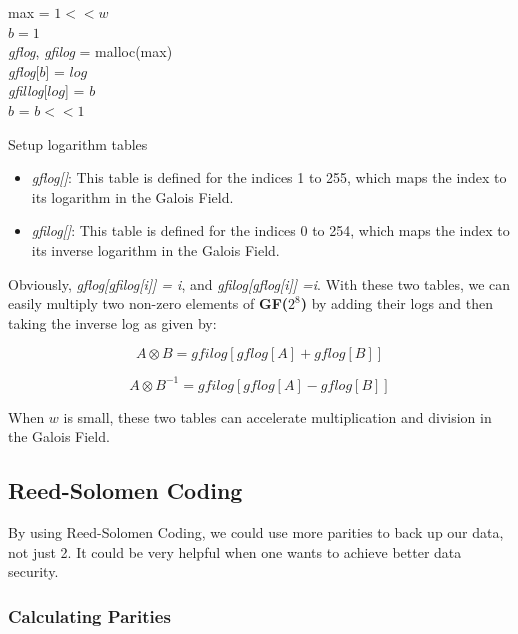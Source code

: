 \documentclass[journal]{IEEEtran}
\begin{document}
\begin{algorithm}
	max = $1<<w$ \\
	$b = 1$ \\
	\emph{gflog}, \emph{gfilog} = malloc(max)\\
	{
		\emph{gflog}[$b$] = $log$\\
		\emph{gfillog}[$log$] = $b$\\
		$b$ = $b<<1$\\
	}
	\caption{Setup logarithm tables}
	\label{alg1}
\end{algorithm}

\begin{itemize}
	\item \emph{gflog[]}: This table is defined for the indices 1 to 255, which maps the index to its logarithm in the Galois Field.
	\item \emph{gfilog[]}: This table is defined for the indices 0 to 254, which maps the index to its inverse logarithm in the Galois Field. 
\end{itemize}

Obviously, \emph{gflog[gfilog[i]] = i}, and \emph{gfilog[gflog[i]] =i}. With these two tables, we can easily multiply two non-zero elements of \textbf{GF($2^8$)} by adding their logs and then taking the inverse log as given by:

\begin{equation}
A \otimes B = gfilog[gflog[A] + gflog[B]]
\end{equation}

\begin{equation}
A \otimes B^{-1} = gfilog[gflog[A] - gflog[B]]
\end{equation}

When $w$ is small, these two tables can accelerate multiplication and division in the Galois Field.

\subsection{Reed-Solomen Coding}

By using Reed-Solomen Coding, we could use more parities to back up our data, not just 2. It could be very helpful when one wants to achieve better data security.

\subsubsection{Calculating Parities}
\end{document}

